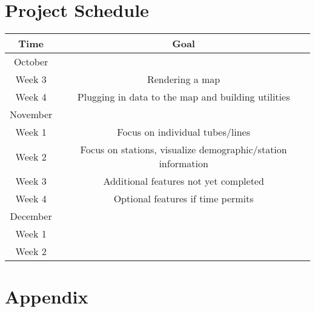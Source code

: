 \documentclass[11pt]{article} %
\begin{document}
\section{Project Schedule}
\begin{center}
\begin{tabular}{c|c}
Time & Goal \\
\hline
\hline
October &  \\

Week 3 & Rendering a map \\
Week 4 & Plugging in data to the map and building utilities \\
\hline
November &  \\
Week 1 & Focus on individual tubes/lines\\
Week 2 & Focus on stations, visualize demographic/station information\\
Week 3 & Additional features not yet completed\\
Week 4 & Optional features if time permits\\
\hline
December & \\
Week 1 & \\
Week 2 & \\
\end{tabular}
\end{center}

\section*{Appendix}


\end{document}
